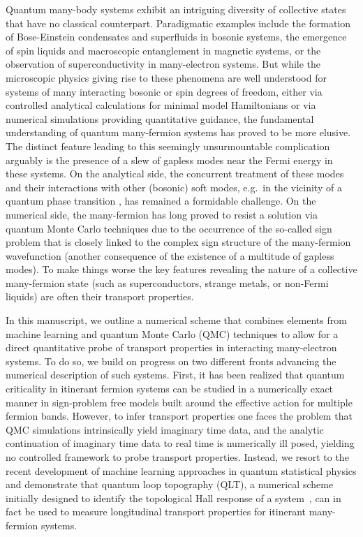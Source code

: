 \documentclass[amsmath,amssymb, aps, prl, twocolumn]{revtex4-1}
\begin{document}
Quantum many-body systems exhibit an intriguing diversity of collective states that have no classical counterpart.
Paradigmatic examples include the formation of Bose-Einstein condensates and superfluids in bosonic systems, 
the emergence of spin liquids and macroscopic entanglement in magnetic systems, 
or the observation of superconductivity in many-electron systems. 
But while the microscopic physics giving rise to these phenomena are well understood for systems 
of many interacting bosonic or spin degrees of freedom, 
either via controlled analytical calculations for minimal model Hamiltonians or via numerical simulations
providing quantitative guidance, the fundamental understanding of quantum many-fermion systems
has proved to be more elusive. The distinct feature leading to this seemingly unsurmountable complication
arguably is the presence of a slew of gapless modes near the Fermi energy in these systems. 
On the analytical side, the concurrent treatment of these modes and their interactions with other (bosonic) soft modes,
e.g.~in the vicinity of a quantum phase transition \cite{Hertz1976,Millis1993}, has remained a formidable challenge.
On the numerical side, the many-fermion has long proved to resist a solution via quantum Monte Carlo techniques
due to the occurrence of the so-called sign problem that is closely linked to the complex sign structure of the 
many-fermion wavefunction (another consequence of the existence of a multitude of gapless modes).
To make things worse the key features revealing the nature of a collective many-fermion state 
(such as superconductors, strange metals, or non-Fermi liquids) are often their transport properties.   

In this manuscript, we outline a numerical scheme that combines elements from machine learning and quantum Monte Carlo (QMC)
techniques to allow for a direct quantitative probe of transport properties in interacting many-electron systems. 
To do so, we build on progress on two different fronts advancing the numerical description of such systems.
First, it has been realized that quantum criticality in itinerant fermion systems can be studied in a numerically exact manner 
in sign-problem free models 
\cite{Berg2012,Schattner2016a,Gerlach2017,Xu2017a,Lederer2017,Li2016,Li2017,Jiang2017,Berg2018}
built around the effective action for multiple fermion bands. 
However, to infer transport properties one faces the problem that QMC simulations intrinsically yield imaginary time data, 
and the analytic continuation of imaginary time data to real time is numerically ill posed, yielding no controlled framework
to probe transport properties. 
Instead, we resort to the recent development of machine learning approaches in quantum statistical physics and demonstrate that quantum loop topography (QLT), a numerical scheme initially designed to identify the topological Hall response of a system~\cite{qlt2016}, can in fact be used to measure  longitudinal transport properties for itinerant many-fermion systems.
\end{document}

